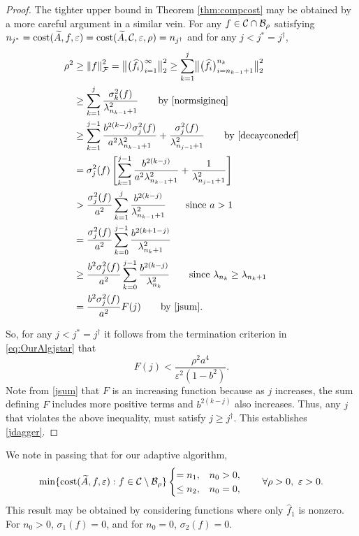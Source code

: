 \documentclass[graybox,footinfo]{svmult}
\newcommand{\DHJRnorm}[2][{}]{\ensuremath{\left \lVert #2 \right \rVert}_{#1}}
\newcommand{\DHJRbignorm}[2][{}]{\ensuremath{\bigl \lVert #2 \bigr \rVert}_{#1}}
\begin{document}
\begin{proof}
The tighter upper bound in Theorem \ref{thm:compcost} may be obtained by a more careful argument in a similar vein.  
For any $f \in  {\mathcal{C}} \cap {\mathcal{B}}_\rho$ satisfying $n_{j^*} = \textup{cost}(\widetilde{A},f,\varepsilon) = \textup{cost}(\widetilde{A}, {\mathcal{C}}, \varepsilon, \rho) = n_{j^{\dagger}}$ and for any $j < j^* = j^\dagger$,
\begin{align*}
\rho^2 &\ge \DHJRnorm[\calF]{f}^2 = \DHJRbignorm[2]{\big( \widehat{f}_i \big)_{i=1}^{\infty}}^2  \ge \sum_{k=1}^j \DHJRbignorm[2]{\big( \widehat{f}_i \big)_{i=n_{k-1}+1}^{n_k}}^2 \\
& \ge \sum_{k=1}^j \frac{\sigma_k^2(f)}{\lambda_{n_{k-1}+1}^2} \qquad \text{by \eqref{normsigineq}}\\
& \ge \sum_{k=1}^{j-1} \frac{ b^{2(k-j)}\sigma_j^2(f)}{a^{2}\lambda_{n_{k-1}+1}^2} + \frac{\sigma_j^2(f)}{\lambda_{n_{j-1}+1}^2} \qquad \text{by \eqref{decayconedef}} \\
& = \sigma_j^2(f) \left[ \sum_{k=1}^{j-1} \frac{b^{2(k-j)}}{a^{2} \lambda_{n_{k-1}+1}^2} + \frac{1}{\lambda_{n_{j-1}+1}^2}\right]\\
&> \frac{ \sigma_j^2(f)}{a^2} \sum_{k=1}^{j} \frac{b^{2(k-j)}}{\lambda_{n_{k-1}+1}^2}  \qquad \text{since } a > 1\\
&= \frac{ \sigma_j^2(f)}{a^2}\sum_{k=0}^{j-1} \frac{b^{2(k+1-j)}}{\lambda_{n_{k}+1}^2}  \\
& \ge  \frac{b^2 \sigma_j^2(f)}{a^2} \sum_{k=0}^{j-1} \frac{b^{2(k-j)}}{\lambda_{n_{k}}^2}  \qquad \text{since } \lambda_{n_k} \ge \lambda_{n_k+1}\\
& = \frac{b^2 \sigma_j^2(f)}{a^2} F(j)
\qquad \text{by } \eqref{jsum}.
\end{align*}

So, for any $j < j^* = j^\dagger$ it follows from the termination criterion in \eqref{eq:OurAlgjstar} that
\begin{equation*}
 F(j) < \frac{ \rho^2 a^4}{\varepsilon^2(1 - b^2)}.
\end{equation*}
Note from \eqref{jsum} that $F$ is an increasing function because as $j$ increases, the sum defining $F$ includes more positive terms and $b^{2(k-j)}$ also increases. Thus, any $j$ that violates the above inequality, must satisfy $j \ge j^\dagger$.  This establishes \eqref{jdagger}.
\end{proof}

We note in passing that for our adaptive algorithm,
\begin{equation*}
 \min \{\textup{cost}(\widetilde{A},f,\varepsilon) : f \in {\mathcal{C}}\setminus {\mathcal{B}}_\rho \} 
 \begin{cases} = n_1, & n_0 > 0, \\
 \le n_2, & n_0 = 0, 
 \end{cases}
 \qquad \forall \rho > 0, \ \varepsilon > 0.
\end{equation*}
This result may be obtained by considering functions where only $\widehat{f}_1$ is nonzero.  For $n_0 > 0$, $\sigma_1(f) = 0$, and for $n_0 = 0$, $\sigma_2(f) = 0$.
\end{document}
